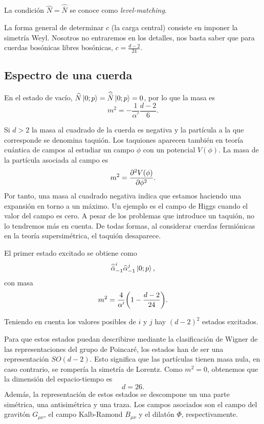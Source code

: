 La condición $\widehat N=\widehat {\bar N}$ se conoce como \emph{level-matching}.

La forma general de determinar $c$ (la carga central) consiste en imponer la simetría Weyl.
Nosotros no entraremos en los detalles, nos basta saber que para cuerdas bosónicas libres
bosónicas, $c=\frac{d-2}{24}$.


\subsection{Espectro de una cuerda}
En el estado de vacío, $\widehat N\ket{0;p}=\widehat {\bar N}\ket{0;p}=0$, por lo que la masa es
\begin{equation}
  m^2 = -\frac{1}{\alpha'}\frac{d-2}{6}.
\end{equation}

Si $d>2$ la masa al cuadrado de la cuerda es negativa y la partícula a la que corresponde se denomina taquión.
Los taquiones aparecen también en teoría cuántica de campos al estudiar un campo $\phi$ con un 
potencial $V(\phi)$.
La masa de la partícula asociada al campo es
\begin{equation}
  m^2 = \pdv[2]{V(\phi)}{\phi}.
\end{equation}
Por tanto, una masa al cuadrado negativa indica que estamos haciendo una expansión en torno
a un máximo. 
Un ejemplo es el campo de Higgs cuando el valor del campo es cero.
A pesar de los problemas que introduce un taquión, no lo tendremos más en cuenta. 
De todas formas, al considerar cuerdas fermiónicas en la teoría supersimétrica, el taquión
desaparece.

El primer estado excitado se obtiene como
\begin{equation}
  \widehat{\bar\alpha}_{-1}^i\widehat \alpha_{-1}^j\ket{0;p},
\end{equation}
con masa
\begin{equation}
  m^2 = \frac{4}{\alpha'}\qty(1-\frac{d-2}{24}).
\end{equation}

Teniendo en cuenta los valores posibles de $i$ y $j$ hay $(d-2)^2$ estados excitados.


Para que estos estados puedan describirse mediante la clasificación de Wigner de las
representaciones del grupo de Poincaré, los estados han de ser una representación $SO(d-2)$.
Esto significa que las partículas tienen masa nula, en caso contrario, se rompería la simetría
de Lorentz. Como $m^2=0$, obtenemos que la dimensión del espacio-tiempo es
\begin{equation}
  d=26.
\end{equation}
Además, la representación de estos estados se descompone un una parte simétrica, una antisimétrica
y una traza. Los campos asociados son el campo del gravitón $G_{\mu\nu}$, el campo Kalb-Ramond $B_{\mu\nu}$
y el dilatón $\Phi$, respectivamente.

